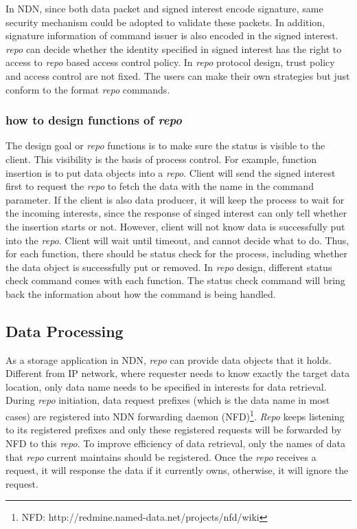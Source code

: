 \documentclass[conference]{IEEEtran}
\begin{document}
In NDN, since both data packet and signed interest encode signature, same security mechanism could be adopted to validate these packets. In addition, signature information of command issuer is also encoded in the signed interest. \emph{repo} can decide whether the identity specified in signed interest has the right to access to \emph{repo} based access control policy. In \emph{repo} protocol design, trust policy and access control are not fixed. The users can make their own strategies but just conform to the format \emph{repo} commands.

\subsubsection{how to design functions of \emph{repo}}

The design goal or \emph{repo} functions is to make sure the status is visible to the client. This visibility is the basis of process control. For example, function insertion is to put data objects into a \emph{repo}. Client will send the signed interest first to request the \emph{repo} to fetch the data with the name in the command parameter. If the client is also data producer, it will keep the process to wait for the incoming interests, since the response of singed interest can only tell whether the insertion starts or not. However, client will not know data is successfully put into the \emph{repo}. Client will wait until timeout, and cannot decide what to do. Thus, for each function, there should be status check for the process, including whether the data object is successfully put or removed. In \emph{repo} design, different status check command comes with each function. The status check command will bring back the information about how the command is being handled.

\subsection{Data Processing}

As a storage application in NDN, \emph{repo} can provide data objects that it holds. Different from IP network, where requester needs to know exactly the target data location, only data name needs to be specified in interests for data retrieval. During \emph{repo} initiation, data request prefixes (which is the data name in most cases) are registered into NDN forwarding daemon (NFD)\footnote{NFD: http://redmine.named-data.net/projects/nfd/wiki}. \emph{Repo} keeps listening to its registered prefixes and only these registered requests will be forwarded by NFD to this \emph{repo}. To improve efficiency of data retrieval, only the names of data that \emph{repo} current maintains should be registered. Once the \emph{repo} receives a request, it will response the data if it currently owns, otherwise, it will ignore the request.
\end{document}
